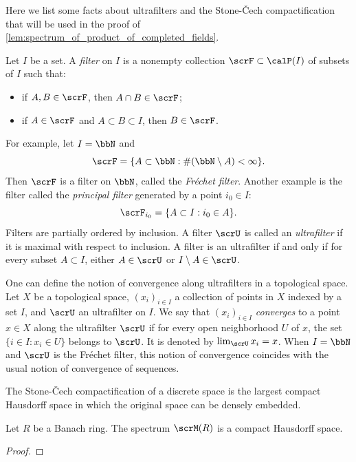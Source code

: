 \begin{remark}\label{rmk:some_fact_about_the_ultrafilters_and_Stone_Cech_compactification}
	Here we list some facts about ultrafilters and the Stone-\v{C}ech compactification that will be used in the proof of \cref{lem:spectrum_of_product_of_completed_fields}.

	Let \(I\) be a set.
	A \emph{filter} on \(I\) is a nonempty collection \(\scrF \subset \calP(I)\) of subsets of \(I\) such that:
	\begin{itemize}
		\item if \(A, B \in \scrF\), then \(A \cap B \in \scrF\);
		\item if \(A \in \scrF\) and \(A \subset B \subset I\), then \(B \in \scrF\).
	\end{itemize}
	For example, let \(I = \bbN\) and
	\[ \scrF = \{ A \subset \bbN : \#(\bbN \setminus A) < \infty \}. \]
	Then \(\scrF\) is a filter on \(\bbN\), called the \emph{Fr\'echet filter}.
	Another example is the filter called the \emph{principal filter} generated by a point \(i_0 \in I\):
	\[ \scrF_{i_0} = \{ A \subset I : i_0 \in A \}. \]
	Filters are partially ordered by inclusion.
	A filter \(\scrU\) is called an \emph{ultrafilter} if it is maximal with respect to inclusion.
	A filter is an ultrafilter if and only if for every subset \(A \subset I\), either \(A \in \scrU\) or \(I \setminus A \in \scrU\).

	One can define the notion of convergence along ultrafilters in a topological space.
	Let \(X\) be a topological space, \((x_i)_{i \in I}\) a collection of points in \(X\) indexed by a set \(I\), and \(\scrU\) an ultrafilter on \(I\).
	We say that \((x_i)_{i \in I}\) \emph{converges} to a point \(x \in X\) along the ultrafilter \(\scrU\) if for every open neighborhood \(U\) of \(x\), the set \(\{i \in I : x_i \in U\}\) belongs to \(\scrU\).
	It is denoted by \(\lim_{\scrU} x_i = x\).
	When \(I = \bbN\) and \(\scrU\) is the Fr\'echet filter, this notion of convergence coincides with the usual notion of convergence of sequences.

	The Stone-\v{C}ech compactification of a discrete space is the largest compact Hausdorff space in which the original space can be densely embedded.
\end{remark}

\begin{theorem}\label{norm_spectrum_of_Banach_rings_is_compact_Hausdorff}
	Let \(R\) be a Banach ring.
	The spectrum \(\scrM(R)\) is a compact Hausdorff space.
\end{theorem}
\begin{proof}
\end{proof}

